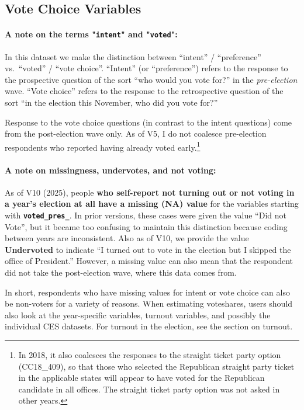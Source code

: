 \documentclass[10pt,article,oneside]{memoir}
\begin{document}
\newpage

\subsection{Vote Choice Variables}\label{vote-choice-variables}

\paragraph{A note on the terms "\texttt{intent}" and "\texttt{voted}":}

In this dataset we make the distinction between ``intent'' /
``preference'' vs.~``voted'' / ``vote choice''. ``Intent'' (or
``preference'') refers to the response to the prospective question of
the sort ``who would you vote for?'' in the \emph{pre-election} wave.
``Vote choice'' refers to the response to the retrospective question of
the sort ``in the election this November, who did you vote for?''

Response to the vote choice questions (in contrast to the intent
questions) come from the post-election wave only. As of V5, I do not
coalesce pre-election respondents who reported having already voted
early.\footnote{In 2018, it also coalesces the responses to the straight ticket party option (CC18\_409), so that those who selected the Republican straight party ticket in the applicable states will appear to have voted for the Republican candidate in all offices. The straight ticket party option was not asked in other years.}

\paragraph{A note on missingness, undervotes, and not voting:}

As of V10 (2025), people \textbf{who self-report not turning out or not
voting in a year's election at all have a missing (NA) value} for the
variables starting with \textbf{\texttt{voted\_pres\_}}. In prior
versions, these cases were given the value ``Did not Vote'', but it
became too confusing to maintain this distinction because coding between
years are inconsistent. Also as of V10, we provide the value
\textbf{Undervoted} to indicate ``I turned out to vote in the election
but I skipped the office of President.'' However, a missing value can
also mean that the respondent did not take the post-election wave, where
this data comes from.

In short, respondents who have missing values for intent or vote choice
can also be non-voters for a variety of reasons. When estimating
voteshares, users should also look at the year-specific variables,
turnout variables, and possibly the individual CES datasets. For turnout
in the election, see the section on turnout.
\end{document}
